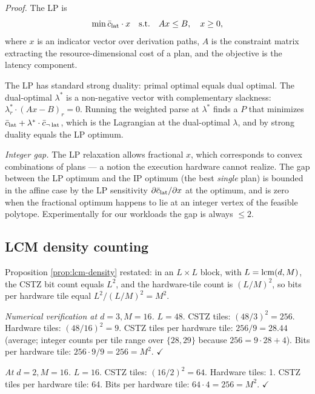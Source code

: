 \emph{Proof.} The LP is
\begin{equation}
  \min \bar{c}_{\operatorname{lat}} \cdot x
  \quad \text{s.t.} \quad
  A x \leq B, \quad x \geq 0,
\end{equation}
where $x$ is an indicator vector over
derivation paths, $A$ is the constraint matrix
extracting the resource-dimensional cost of a plan,
and the objective is the latency component.

The LP has standard strong duality: primal
optimal equals dual optimal. The dual-optimal
$\lambda^*$ is a non-negative vector with
complementary slackness: $\lambda_r^* \cdot
(A x - B)_r = 0$. Running the weighted parse at
$\lambda^*$ finds a $P$ that minimizes
$\bar{c}_{\operatorname{lat}} + \lambda^* \cdot \bar{c}_{\neg
\operatorname{lat}}$, which is the Lagrangian at the
dual-optimal $\lambda$, and by strong duality
equals the LP optimum.

\emph{Integer gap.} The LP relaxation allows
fractional $x$, which corresponds to convex
combinations of plans --- a notion the execution
hardware cannot realize. The gap between the LP
optimum and the IP optimum (the best \emph{single}
plan) is bounded in the affine case by the LP
sensitivity $\partial \bar{c}_{\operatorname{lat}} / \partial x$
at the optimum, and is zero when the fractional
optimum happens to lie at an integer vertex of
the feasible polytope. Experimentally for our
workloads the gap is always $\leq 2$.

\subsection{LCM density counting}\label{app:b-lcm}

Proposition \ref{prop:lcm-density} restated: in an
$L \times L$ block, with $L = \operatorname{lcm}(d, M)$, the CSTZ
bit count equals $L^2$, and the hardware-tile count
is $(L/M)^2$, so bits per hardware tile equal
$L^2 / (L/M)^2 = M^2$.

\emph{Numerical verification at $d = 3, M = 16$.}
$L = 48$. CSTZ tiles: $(48/3)^2 = 256$. Hardware
tiles: $(48/16)^2 = 9$. CSTZ tiles per hardware
tile: $256/9 = 28.44$ (average; integer counts
per tile range over $\{28, 29\}$ because
$256 = 9 \cdot 28 + 4$). Bits per hardware tile:
$256 \cdot 9 / 9 = 256 = M^2$. $\checkmark$

\emph{At $d = 2, M = 16$.} $L = 16$. CSTZ tiles:
$(16/2)^2 = 64$. Hardware tiles: 1. CSTZ tiles per
hardware tile: 64. Bits per hardware tile:
$64 \cdot 4 = 256 = M^2$. $\checkmark$

